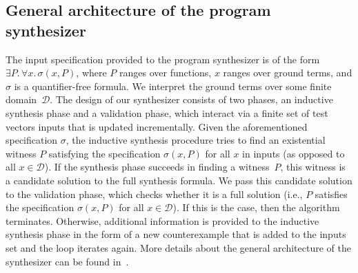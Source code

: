 \documentclass[runningheads,a4paper]{llncs}
\begin{document}

 
\subsection{General architecture of the program synthesizer}
\label{synthesizer-general}
The input specification provided to the program synthesizer is of the form
$\exists P .\,  \forall x.\,  \sigma(x, P)$, 
where $P$ ranges over functions, 
$x$ ranges over ground terms, 
and $\sigma$ is a quantifier-free formula.  
We interpret the ground terms over some finite domain~$\mathcal{D}$.
%
The design of our synthesizer consists of two phases, an inductive
synthesis phase and a validation phase, which interact via a finite
set of test vectors {\sc inputs} that is updated incrementally.  Given
the aforementioned specification $\sigma$, the inductive synthesis
procedure tries to find an existential witness $P$ satisfying
the specification $\sigma(x, P)$ for all $x$ in {\sc
  inputs} (as opposed to all $x \in \mathcal{D}$).
%
If the synthesis phase succeeds in finding a witness~$P$, this
witness is a candidate solution to the full synthesis formula.  We
pass this candidate solution to the validation phase, which checks
whether it is a full solution (i.e., $P$ satisfies the
specification $\sigma(x, P)$ for all
$x\in\mathcal{D}$).  If this is the case, then the algorithm
terminates.  Otherwise, additional information is provided to the
inductive synthesis phase in the form of a new counterexample that is
added to the {\sc inputs} set and the loop iterates again.
More details about the general architecture of the synthesizer can
be found in~\cite{DBLP:conf/lpar/DavidKL15}.
\end{document}
